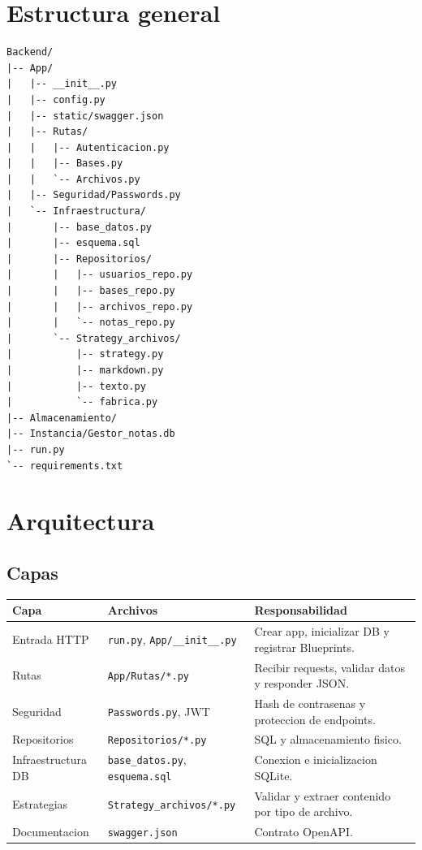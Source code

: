 \documentclass[12pt,a4paper]{article}
\begin{document}
\section{Estructura general}

\begin{lstlisting}
Backend/
|-- App/
|   |-- __init__.py
|   |-- config.py
|   |-- static/swagger.json
|   |-- Rutas/
|   |   |-- Autenticacion.py
|   |   |-- Bases.py
|   |   `-- Archivos.py
|   |-- Seguridad/Passwords.py
|   `-- Infraestructura/
|       |-- base_datos.py
|       |-- esquema.sql
|       |-- Repositorios/
|       |   |-- usuarios_repo.py
|       |   |-- bases_repo.py
|       |   |-- archivos_repo.py
|       |   `-- notas_repo.py
|       `-- Strategy_archivos/
|           |-- strategy.py
|           |-- markdown.py
|           |-- texto.py
|           `-- fabrica.py
|-- Almacenamiento/
|-- Instancia/Gestor_notas.db
|-- run.py
`-- requirements.txt
\end{lstlisting}

\section{Arquitectura}

\subsection{Capas}

\begin{longtable}{|p{3cm}|p{5cm}|p{7cm}|}
\hline
\textbf{Capa} & \textbf{Archivos} & \textbf{Responsabilidad} \\
\hline
Entrada HTTP & \texttt{run.py}, \texttt{App/\_\_init\_\_.py} & Crear app, inicializar DB y registrar Blueprints. \\
\hline
Rutas & \texttt{App/Rutas/*.py} & Recibir requests, validar datos y responder JSON. \\
\hline
Seguridad & \texttt{Passwords.py}, JWT & Hash de contrasenas y proteccion de endpoints. \\
\hline
Repositorios & \texttt{Repositorios/*.py} & SQL y almacenamiento fisico. \\
\hline
Infraestructura DB & \texttt{base\_datos.py}, \texttt{esquema.sql} & Conexion e inicializacion SQLite. \\
\hline
Estrategias & \texttt{Strategy\_archivos/*.py} & Validar y extraer contenido por tipo de archivo. \\
\hline
Documentacion & \texttt{swagger.json} & Contrato OpenAPI. \\
\hline
\end{longtable}
\end{document}
